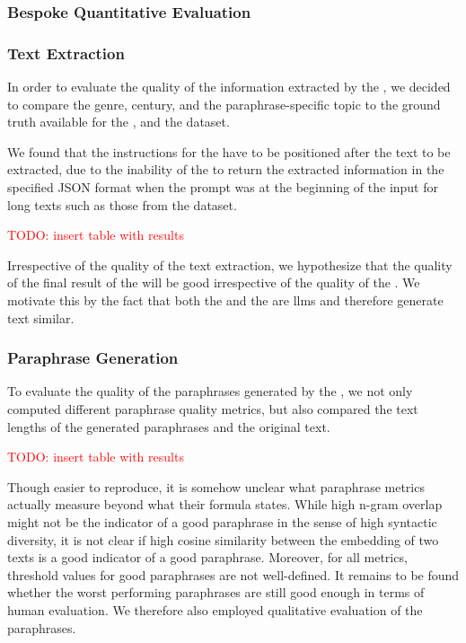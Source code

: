

\subsubsection{Bespoke Quantitative Evaluation}
\label{subsec:custom_quantitative_evaluation}

\subsubsection{Text Extraction}
\label{subsec:text_extraction}

In order to evaluate the quality of the information extracted by the \pextractor{}, 
we decided to compare the genre, century, and the paraphrase-specific topic to the 
ground truth available for the \dataBlog{}, \dataGutenberg{} and the \dataCustom{} dataset.

We found that the instructions for the \pextractor{} have to be positioned after the text to be extracted, 
due to the inability of the \pextractor{} to return the extracted information in the specified JSON format 
when the prompt was at the beginning of the input for long texts such as those from the \dataGutenberg{} dataset.

\textcolor{red}{TODO: insert table with results}

Irrespective of the quality of the text extraction, we hypothesize that the quality of the final result of the \pgenerator{} will be good irrespective of the quality of the \pextractor{}.
We motivate this by the fact that both the \pextractor{} and the \pgenerator{} are \acp{llm} and therefore generate text similar.

\subsubsection{Paraphrase Generation}
\label{subsec:paraphrase_generation}
To evaluate the quality of the paraphrases generated by the \pgenerator{}, 
we not only computed different paraphrase quality metrics, 
but also compared the text lengths of the generated paraphrases and the original text.

\textcolor{red}{TODO: insert table with results}

Though easier to reproduce, it is somehow unclear what paraphrase metrics actually measure beyond what their formula states.
While high n-gram overlap might not be the indicator of a good paraphrase in the sense of high syntactic diversity, 
it is not clear if high cosine similarity between the embedding of two texts is a good indicator of a good paraphrase.
Moreover, for all metrics, threshold values for good paraphrases are not well-defined.
It remains to be found whether the worst performing paraphrases are still good enough in terms of human evaluation.
We therefore also employed qualitative evaluation of the paraphrases.

